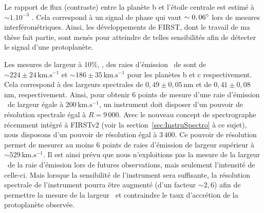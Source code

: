 Le rapport de flux (contraste) entre la planète b et l'étoile centrale est estimé à $\sim 1.10^{-3}$ \citep{wagner2018, zhou2021}. Cela correspond à un signal de phase qui vaut $\sim 0,06^{\circ}$ lors de mesures interférométriques. Ainsi, les développements de \ac{FIRST}, dont le travail de ma thèse fait partie, sont menés pour atteindre de telles sensibilités afin de détecter le signal d'une protoplanète.

Les mesures de largeur à $10\%$, \Wd, des raies d'émission \ha~de \cite{haffert2019} sont de $\sim 224 \pm 24 \, \text{km}.\text{s}^{-1}$ et $\sim 186 \pm 35 \, \text{km}.\text{s}^{-1}$ pour les planètes b et c respectivement. Cela correspond à des largeurs spectrales de $0,49 \pm 0,05 \,$nm et de $0,41 \pm 0,08 \,$nm, respectivement. Ainsi, pour obtenir $6$ points de mesure d'une raie d'émission \ha~de largeur égale à $200 \, \text{km}.\text{s}^{-1}$, un instrument doit disposer d'un pouvoir de résolution spectrale égal à $R = 9\,000$. Avec le nouveau concept de spectrographe récemment intégré à \ac{FIRSTv2} (voir la section~\ref{sec:InstruSpectro} à ce sujet), nous disposons d'un pouvoir de résolution égal à $3\,400$. Ce pouvoir de résolution permet de mesurer au moins $6$ points de raies d'émission de largeur supérieur à $\sim 529 \, \text{km}.\text{s}^{-1}$. Il est ainsi prévu que nous n'exploitions pas la mesure de la largeur \Wd~de la raie d'émission lors de futures observations, mais seulement l'intensité de celle-ci. Mais lorsque la sensibilité de l'instrument sera suffisante, la résolution spectrale de l'instrument pourra être augmenté (d'un facteur $\sim 2,6$) afin de permettre la mesure de la largeur \Wd~et contraindre le taux d'accrétion de la protoplanète observée.

